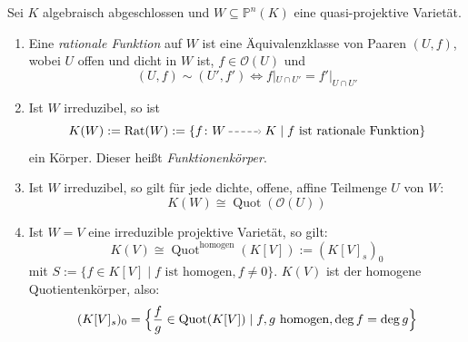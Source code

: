 \documentclass[a4paper,12pt,index=toc]{scrbook}
\theoremstyle{keinenummern} %
\def\O{\mathcal{O}}
\def\P{\mathbb{P}}
\newcommand{\Rat}{\mathrm{Rat}}
\newcommand{\Quot}{\operatorname{Quot}}
\newcommand{\restrict}[1]{|_{#1}}
\begin{document}
\begin{db}\label{2.6.5}
 Sei $K$ algebraisch abgeschlossen und $W\subseteq \P^n(K)$ eine quasi-projektive Varietät.
\begin{enumerate}
  \item{} Eine \emph{rationale Funktion} auf $W$ ist eine Äquivalenzklasse von Paaren $(U,f)$, wobei $U$ offen und dicht in $W$ ist, $f\in \O(U)$ und
  \begin{equation*}(U,f)\sim (U',f') \iff f\restrict{U\cap U'}=f'\restrict{U\cap U'}\end{equation*}
  \item{} Ist $W$ irreduzibel, so ist 
  \begin{equation*}K(W):=\Rat(W):=\{f\colon W \ppf K \mid f \text{ ist rationale Funktion}\}\end{equation*}
  ein Körper. Dieser heißt \emph{Funktionenkörper}. 
  \item{} Ist $W$ irreduzibel, so gilt für jede dichte, offene, affine Teilmenge $U$ von $W$:
\begin{equation*}K(W)\cong \Quot(\O(U))\end{equation*}
  \item{} Ist $W=V$ eine irreduzible projektive Varietät, so gilt:
\begin{equation*}K(V)\cong \Quot^{\mathrm{homogen}}(K[V]):=(K[V]_s)_0\end{equation*} 
mit $S:=\{f\in K[V] \mid f \text{ ist homogen}, f\neq 0 \}$. $K(V)$ ist der homogene Quotientenkörper, also:
\begin{equation*}(K[V]_s)_0=\Bigl\{\frac{f}{g} \in \Quot(K[V]) \mid f,g \text{ homogen}, \deg f=\deg g\Bigr\}\end{equation*}
\end{enumerate}
\end{db}
\end{document}
